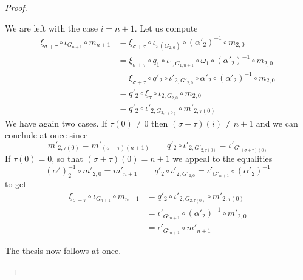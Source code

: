 \begin{proof}
\begin{itemize}
\begin{itemize}
			We are left with the case $i=n+1$. Let us compute
			\begin{align*}
				\xi_{\sigma+\tau}\circ \iota_{G_{n+1}} \circ m_{n+1} &= \xi_{\sigma+\tau} \circ \iota_{\pi(G_{2,0})} \circ (\alpha'_2)^{-1}\circ m_{2,0}\\&=\xi_{\sigma+\tau} \circ q_1\circ \iota_{1, G_{1,n+1}} \circ \omega_1 \circ (\alpha'_2)^{-1}\circ m_{2,0}\\&=\xi_{\sigma+\tau} \circ q'_2 \circ \iota'_{2,G'_{2,0}} \circ \alpha'_2 \circ (\alpha'_2)^{-1}\circ m_{2,0} \\&=q'_2 \circ \xi_\tau \circ \iota_{2, G_{2,0}} \circ m_{2,0}\\&=q'_2\circ \iota'_{2, G_{2,\tau(0)}} \circ m'_{2,\tau(0)}
			\end{align*}
			We have again two cases. If $\tau(0)\neq 0$ then $(\sigma+\tau)(i)\neq n+1$ and we can conclude at once since 
			\[m'_{2, \tau(0)}=m'_{(\sigma+\tau)(n+1)} \qquad q'_2\circ \iota'_{2, G'_{2,\tau(0)}}=
			\iota'_{G'_{(\sigma+\tau)(0)}}\] 
			If $\tau(0)=0$, so that  $(\sigma+\tau)(0)= n+1$ we appeal to the equalities
			\[(\alpha')^{-1}_2\circ m'_{2, 0}=m'_{n+1} \qquad q'_2\circ \iota'_{2, G'_{2, 0}}=
			\iota'_{G'_{n+1}}\circ (\alpha'_2)^{-1}\] 
			to get
			\begin{align*}
				\xi_{\sigma+\tau}\circ \iota_{G_{n+1}} \circ m_{n+1} &= q'_2\circ \iota'_{2, G_{2,\tau(0)}} \circ m'_{2,\tau(0)}\\&=	\iota'_{G'_{n+1}}\circ (\alpha'_2)^{-1}\circ m'_{2,0}\\&=\iota'_{G'_{n+1}}\circ  m'_{n+1}
			\end{align*}
		\end{itemize}
		The thesis now follows at once.	 \qedhere 
\end{itemize} \end{proof}

